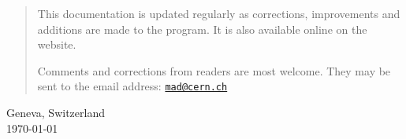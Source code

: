 \begin{titlepage}
\begin{quotation}
This documentation is updated regularly as corrections, improvements
and additions are made to the program. 
It is also available online on the \href{http://cern.ch/madx}{\madx} website.


Comments and corrections from readers are most welcome.
They may be sent to the email address:
\href{mailto:mad@cern.ch?subject=[user's guide]}{\texttt{mad@cern.ch}}
\end{quotation}
\vfill

\begin{center}
Geneva, Switzerland \\
\today
\end{center}

\end{titlepage}
